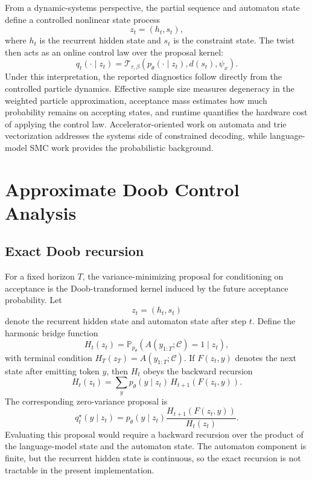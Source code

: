 \documentclass[11pt]{article}
\begin{document}
From a dynamic-systems perspective, the partial sequence and automaton state define a controlled nonlinear state process
\[
z_t = (h_t, s_t),
\]
where $h_t$ is the recurrent hidden state and $s_t$ is the constraint state. The twist then acts as an online control law over the proposal kernel:
\[
q_t(\cdot \mid z_t) = \mathcal{T}_{\tau,\beta}\!\left(p_\theta(\cdot \mid z_t), d(s_t), \psi_x\right).
\]
Under this interpretation, the reported diagnostics follow directly from the controlled particle dynamics. Effective sample size measures degeneracy in the weighted particle approximation, acceptance mass estimates how much probability remains on accepting states, and runtime quantifies the hardware cost of applying the control law. Accelerator-oriented work on automata and trie vectorization \citep{su2026vectorizing} addresses the systems side of constrained decoding, while language-model SMC work \citep{zhao2024probabilistic,wu2024step} provides the probabilistic background.

\section{Approximate Doob Control Analysis}
\subsection{Exact Doob recursion}
For a fixed horizon $T$, the variance-minimizing proposal for conditioning on acceptance is the Doob-transformed kernel induced by the future acceptance probability. Let
\[
z_t = (h_t, s_t)
\]
denote the recurrent hidden state and automaton state after step $t$. Define the harmonic bridge function
\[
H_t(z_t) = \mathbb{P}_{p_\theta}\!\left(A(y_{1:T};\mathcal{C}) = 1 \mid z_t\right),
\]
with terminal condition $H_T(z_T)=A(y_{1:T};\mathcal{C})$. If $F(z_t,y)$ denotes the next state after emitting token $y$, then $H_t$ obeys the backward recursion
\[
H_t(z_t) = \sum_{y} p_\theta(y \mid z_t)\, H_{t+1}(F(z_t,y)).
\]
The corresponding zero-variance proposal is
\[
q_t^\star(y \mid z_t)
=
p_\theta(y \mid z_t)
\frac{H_{t+1}(F(z_t,y))}{H_t(z_t)}.
\]
Evaluating this proposal would require a backward recursion over the product of the language-model state and the automaton state. The automaton component is finite, but the recurrent hidden state is continuous, so the exact recursion is not tractable in the present implementation.
\end{document}

